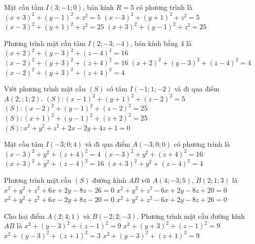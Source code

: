 \begin{ex}%
	Mặt cầu tâm $I(3;-1;0)$, bán kính $R=5$ có phương trình là
	\choice
	{$(x+3)^2+(y-1)^2+z^2=5$}
	{$(x-3)^2+(y+1)^2+z^2=5$}
	{\True $(x-3)^2+(y+1)^2+z^2=25$}
	{$(x+3)^2+(y-1)^2+z^2=25$}
\end{ex}
\begin{ex}%
	Phương trình mặt cầu tâm $I(2; -3; -4)$, bán kính bằng $4$ là
	\choice
	{$(x+2)^2+(y-3)^2+(z-4)^2=16$}
	{\True $(x-2)^2+(y+3)^2+(z+4)^2=16$}
	{$(x+2)^2+(y-3)^2+(z-4)^2=4$}
	{$(x-2)^2+(y+3)^2+(z+4)^2=4$}
	\loigiai
	{
	}
\end{ex}
\begin{ex}%
	Viết phương trình mặt cầu $(S)$ có tâm $I(-1;1;-2)$ và đi qua điểm $A(2;;1;2)$.
	\choice%
	{$(S)\colon (x-1)^2 +(y+1)^2 +(z-2)^2=5$}
	{$(S)\colon (x-2)^2 +(y-1)^2 +(z-2)^2=25$}
	{\True $(S)\colon (x+1)^2 +(y-1)^2 +(z+2)^2=25$}
	{$(S)\colon x^2 +y^2 +z^2 +2x -2y +4z + 1 = 0$}
\end{ex}
\begin{ex}%
	Mặt cầu tâm $I(-3; 0; 4)$ và đi qua điểm $A(-3; 0; 0)$ có phương trình là
	\choice
	{$(x-3)^2+y^2+(z+4)^2=4$}
	{$(x-3)^2+ y^2 + (z+4)^2=16$}
	{\True $(x+3)^2+y^2+(z-4)^2=16$}
	{$(x+3)^2+y^2+(z-4)^2=4$}
\end{ex}
\begin{ex}%
	Phương trình mặt cầu $\left(S\right)$ đường kính $AB$ với $A\left(4; -3; 5\right)$, $B\left(2; 1; 3\right)$ là
	\choice
	{$x^2 + y^2 + z^2 + 6x + 2y - 8z - 26 = 0$}
	{\True $x^2 + y^2 + z^2 - 6x + 2y - 8z + 20 = 0$}
	{$x^2 + y^2 + z^2 + 6x -  2y + 8z - 20 = 0$}
	{$x^2 + y^2 + z^2 - 6x + 2y - 8z +  26 = 0$}
\end{ex}
\begin{ex}%
	Cho hai điểm $A(2; 4; 1)$ và $B(-2; 2; -3)$. Phương trình mặt cầu đường kính $AB$ là
	\choice
	{$x^2+(y-3)^2+(z-1)^2=9$}
	{$x^2+(y+3)^2+(z-1)^2=9$}
	{$x^2+(y-3)^2+(z+1)^2=3$}
	{\True $x^2+(y-3)^2+(z+1)^2=9$}
\end{ex}

